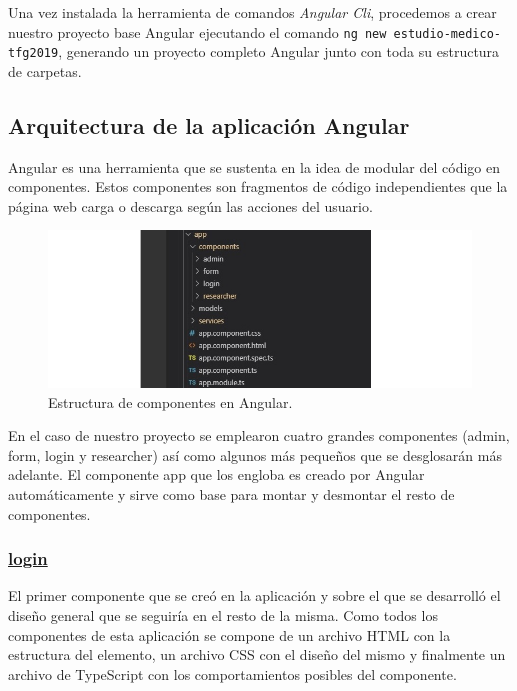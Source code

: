     \FloatBarrier
    
    Una vez instalada la herramienta de comandos \textit{Angular Cli}, procedemos a crear nuestro proyecto base Angular ejecutando el comando \texttt{ng new estudio-medico-tfg2019}, generando un proyecto completo Angular junto con toda su estructura de carpetas.
    
    
    
    \subsection{Arquitectura de la aplicación Angular}
    
    Angular es una herramienta que se sustenta en la idea de modular del código en componentes. Estos componentes son fragmentos de código independientes que la página web carga o descarga según las acciones del usuario. 
    
    \begin{figure}[h]
    \centering
     \includegraphics[width=1\textwidth]{images/componentesAngular.jpg}
    \caption{Estructura de componentes en Angular.}
    \end{figure}
    
     \FloatBarrier
    
    En el caso de nuestro proyecto se emplearon cuatro grandes componentes (admin, form, login y researcher) así como algunos más pequeños que se desglosarán más adelante. El componente app que los engloba es creado por Angular automáticamente y sirve como base para montar y desmontar el resto de componentes.
    
    \subsubsection{\underline{login}}

    El primer componente que se creó en la aplicación y sobre el que se desarrolló el diseño general que se seguiría en el resto de la misma. Como todos los componentes de esta aplicación se compone de un archivo HTML con la estructura del elemento, un archivo CSS con el diseño del mismo y finalmente un archivo de TypeScript con los comportamientos posibles del componente.\newline
    
